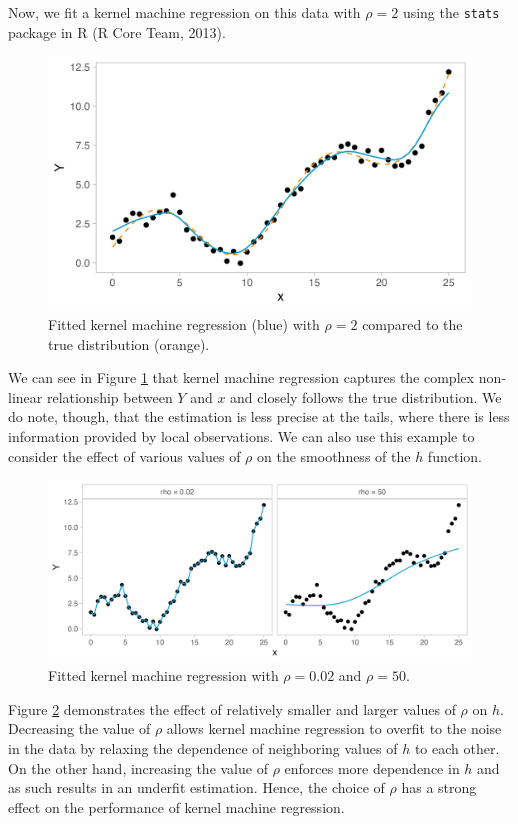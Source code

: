 \documentclass[12pt, twoside]{amherstthesis}
\begin{document}
Now, we fit a kernel machine regression on this data with \(\rho=2\) using the \texttt{stats} package in R (R Core Team, 2013).
\begin{figure}

{\centering \includegraphics[width=0.75\linewidth]{figures/ch3_toy3} 

}

\caption{Fitted kernel machine regression (blue) with $\rho=2$ compared to the true distribution (orange).}\label{fig:toy3}
\end{figure}
We can see in Figure \ref{fig:toy3} that kernel machine regression captures the complex non-linear relationship between \(Y\) and \(x\) and closely follows the true distribution. We do note, though, that the estimation is less precise at the tails, where there is less information provided by local observations. We can also use this example to consider the effect of various values of \(\rho\) on the smoothness of the \(h\) function.
\begin{figure}

{\centering \includegraphics[width=1\linewidth]{figures/ch3_toyrho} 

}

\caption{Fitted kernel machine regression with $\rho=0.02$ and $\rho=50$.}\label{fig:toyrho}
\end{figure}
Figure \ref{fig:toyrho} demonstrates the effect of relatively smaller and larger values of \(\rho\) on \(h\). Decreasing the value of \(\rho\) allows kernel machine regression to overfit to the noise in the data by relaxing the dependence of neighboring values of \(h\) to each other. On the other hand, increasing the value of \(\rho\) enforces more dependence in \(h\) and as such results in an underfit estimation. Hence, the choice of \(\rho\) has a strong effect on the performance of kernel machine regression.
\end{document}
